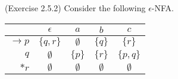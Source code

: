 \documentclass[10pt]{homework}
\begin{document}
\begin{problem} (Exercise 2.5.2) Consider the following $\epsilon$-NFA\@.

  \begin{table}[h]
    \centering
    \begin{tabular}{r||c|c|c|c} %
      & $\epsilon$ & $a$ & $b$ & $c$\\\hline\hline %
      $\rightarrow p$ & $\{q, r\}$ & $\emptyset$ & $\{q\}$ & $\{r\}$\\
      $q$ & $\emptyset$ & $\{p\}$ & $\{r\}$ & $\{p,q\}$\\
      $*r$ & $\emptyset$ & $\emptyset$ & $\emptyset$ & $\emptyset$\\
    \end{tabular}
  \end{table}

\end{problem}
\end{document}
